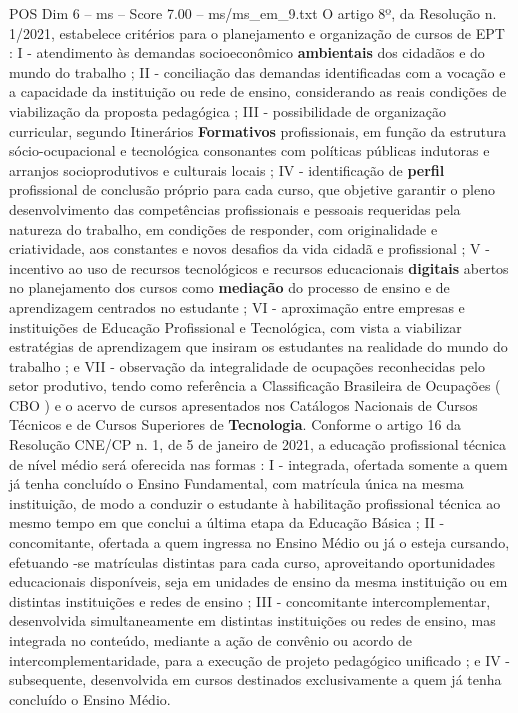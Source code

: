 \begin{textsample}{POS Dim 6 – ms – Score 7.00 – ms/ms\_em\_9.txt}
O artigo 8º, da Resolução n. 1/2021, estabelece critérios para o planejamento e organização de cursos de EPT : I - atendimento às demandas socioeconômico \textbf{ambientais} dos cidadãos e do mundo do trabalho ; II - conciliação das demandas identificadas com a vocação e a capacidade da instituição ou rede de ensino, considerando as reais condições de viabilização da proposta pedagógica ; III - possibilidade de organização curricular, segundo Itinerários \textbf{Formativos} profissionais, em função da estrutura sócio-ocupacional e tecnológica consonantes com políticas públicas indutoras e arranjos socioprodutivos e culturais locais ; IV - identificação de \textbf{perfil} profissional de conclusão próprio para cada curso, que objetive garantir o pleno desenvolvimento das competências profissionais e pessoais requeridas pela natureza do trabalho, em condições de responder, com originalidade e criatividade, aos constantes e novos desafios da vida cidadã e profissional ; V - incentivo ao uso de recursos tecnológicos e recursos educacionais \textbf{digitais} abertos no planejamento dos cursos como \textbf{mediação} do processo de ensino e de aprendizagem centrados no estudante ; VI - aproximação entre empresas e instituições de Educação Profissional e Tecnológica, com vista a viabilizar estratégias de aprendizagem que insiram os estudantes na realidade do mundo do trabalho ; e VII - observação da integralidade de ocupações reconhecidas pelo setor produtivo, tendo como referência a Classificação Brasileira de Ocupações ( CBO ) e o acervo de cursos apresentados nos Catálogos Nacionais de Cursos Técnicos e de Cursos Superiores de \textbf{Tecnologia}.
Conforme o artigo 16 da Resolução CNE/CP n. 1, de 5 de janeiro de 2021, a educação profissional técnica de nível médio será oferecida nas formas : I - integrada, ofertada somente a quem já tenha concluído o Ensino Fundamental, com matrícula única na mesma instituição, de modo a conduzir o estudante à habilitação profissional técnica ao mesmo tempo em que conclui a última etapa da Educação Básica ; II - concomitante, ofertada a quem ingressa no Ensino Médio ou já o esteja cursando, efetuando -se matrículas distintas para cada curso, aproveitando oportunidades educacionais disponíveis, seja em unidades de ensino da mesma instituição ou em distintas instituições e redes de ensino ; III - concomitante intercomplementar, desenvolvida simultaneamente em distintas instituições ou redes de ensino, mas integrada no conteúdo, mediante a ação de convênio ou acordo de intercomplementaridade, para a execução de projeto pedagógico unificado ; e IV - subsequente, desenvolvida em cursos destinados exclusivamente a quem já tenha concluído o Ensino Médio.

\end{textsample}
